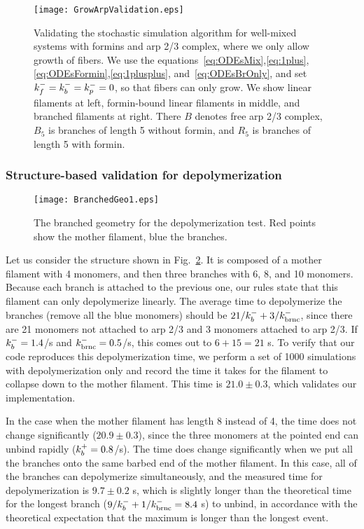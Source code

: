 \documentclass[11pt]{article}
\begin{document}
\begin{appendices}
\begin{figure}
\centering
\texttt{[image: GrowArpValidation.eps]}
\caption{\label{fig:GrowArpValid}Validating the stochastic simulation algorithm for well-mixed systems with formins and arp 2/3 complex, where we only allow growth of fibers. We use the equations\ \eqref{eq:ODEsMix},\eqref{eq:1plus},\eqref{eq:ODEsFormin},\eqref{eq:1plusplus}, and\ \eqref{eq:ODEsBrOnly}, and set $k_f^-=k_b^-=k_p^-=0$, so that fibers can only grow. We show linear filaments at left, formin-bound linear filaments in middle, and branched filaments at right. There $B$ denotes free arp 2/3 complex, $B_5$ is branches of length 5 without formin, and $R_5$ is branches of length 5 with formin.  }
\end{figure}


\subsubsection{Structure-based validation for depolymerization}
\begin{figure}
\centering
\texttt{[image: BranchedGeo1.eps]}
\caption{\label{fig:BranchedGeo}The branched geometry for the depolymerization test. Red points show the mother filament, blue the branches.}
\end{figure}

Let us consider the structure shown in Fig.\ \ref{fig:BranchedGeo}. It is composed of a mother filament with 4 monomers, and then three branches with 6, 8, and 10 monomers. Because each branch is attached to the previous one, our rules state that this filament can only depolymerize linearly. The average time to depolymerize the branches (remove all the blue monomers) should be $21/k_b^-+3/k_\text{brnc}^-$, since there are 21 monomers not attached to arp 2/3 and 3 monomers attached to arp 2/3. If $k_b^-=1.4$/s and $k_\text{brnc}^-=0.5$/s, this comes out to $6+15=21$ s. To verify that our code reproduces this depolymerization time, we perform a set of 1000 simulations with depolymerization only and record the time it takes for the filament to collapse down to the mother filament. This time is $21.0 \pm 0.3$, which validates our implementation. 

In the case when the mother filament has length 8 instead of 4, the time does not change significantly ($20.9 \pm 0.3$), since the three monomers at the pointed end can unbind rapidly ($k_b^+=0.8$/s). The time does change significantly when we put all the branches onto the same barbed end of the mother filament. In this case, all of the branches can depolymerize simultaneously, and the measured time for depolymerization is $9.7 \pm 0.2$ s, which is slightly longer than the theoretical time for the longest branch ($9/k_b^-+1/k_\text{brnc}^-=8.4$ s) to unbind, in accordance with the theoretical expectation that the maximum is longer than the longest event.


\end{appendices}






\end{document}
